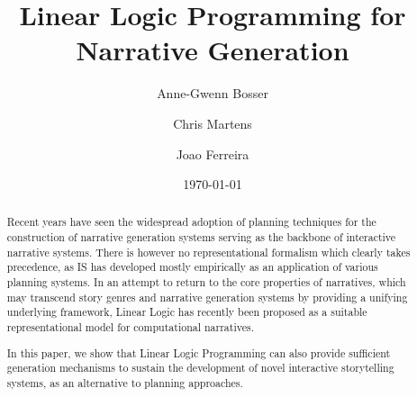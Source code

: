 \documentclass{llncs}
\title{Linear Logic Programming for Narrative Generation}
\author{Anne-Gwenn Bosser \and Chris Martens \and Joao Ferreira}
\date{\today}
\begin{document}
\maketitle


\begin{abstract}
Recent years have seen the widespread adoption of planning techniques for
the construction of narrative generation systems serving as the backbone
of interactive narrative systems. There is however no representational
formalism which clearly takes precedence, as IS has developed mostly
empirically as an application of various planning systems. In an attempt
to return to the core properties of narratives, which may transcend story
genres and narrative generation systems by providing a unifying underlying
framework, Linear Logic has recently been proposed as a suitable
representational model for computational narratives. 

In this paper, we show that Linear Logic Programming can also provide
sufficient generation mechanisms to sustain the development of novel
interactive storytelling systems, as an alternative to planning
approaches. 
\end{abstract}
\end{document}
